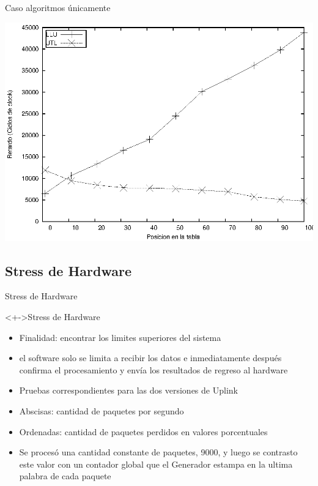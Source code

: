 \documentclass[xcolor=dvipsnames]{beamer}
\begin{document}
\begin{frame}{Caso algoritmos únicamente} 
\begin{center}
\includegraphics[scale=0.70]{figures/llu-utlsof.eps} 
\end{center}
\end{frame}

\subsection{Stress de Hardware}

\begin{frame}{Stress de Hardware} 
\begin{block}<+->{Stress de Hardware}   
    \begin{itemize}
      \scriptsize
     	\item Finalidad: encontrar los limites superiores del sistema
     	\item el software solo se limita a recibir los datos e inmediatamente después confirma el procesamiento y envía los resultados de regreso al hardware
	\item Pruebas correspondientes para las dos versiones de Uplink
	\item Abscisas: cantidad de paquetes por segundo
	\item Ordenadas: cantidad de paquetes perdidos en valores porcentuales
	\item Se procesó una cantidad constante de paquetes, 9000, y luego se contrasto este valor con un contador global que el Generador estampa en la ultima palabra de cada paquete
    \end{itemize}
  \end{block}
\end{frame}
\end{document}
